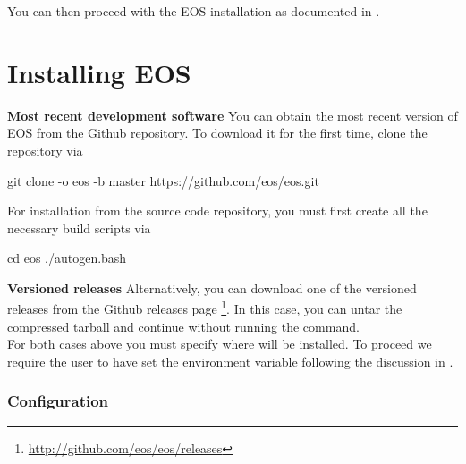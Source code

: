 You can then proceed with the EOS installation as documented in .

\section{Installing EOS}
\label{sec:inst:EOS}

\textbf{Most recent development software}\quad
You can obtain the most recent version of EOS from the Github repository.
To download it for the first time, clone the repository via
%
\begin{commandline}
git clone -o eos -b master https://github.com/eos/eos.git
\end{commandline}

For installation from the source code repository, you must first create all the necessary build scripts via
%
\begin{commandline}
cd eos
./autogen.bash
\end{commandline}
%

\textbf{Versioned releases}\quad
Alternatively, you can download one of the versioned releases from the Github releases page
\footnote{\url{http://github.com/eos/eos/releases}}. In this case, you can
untar the compressed tarball and continue without running the 
command.\\

For both cases above you must specify where \EOS will be installed. To proceed we
require the user to have set the  environment variable following
the discussion in .

\subsubsection{Configuration}

